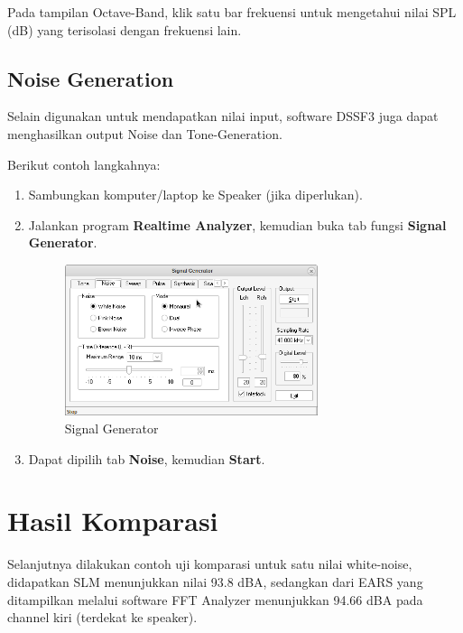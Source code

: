 \documentclass[12pt]{book}
\begin{document}
	Pada tampilan Octave-Band, klik satu bar frekuensi untuk mengetahui nilai SPL (dB)
	yang terisolasi dengan frekuensi lain.

	\subsection{Noise Generation}

	Selain digunakan untuk mendapatkan nilai input, software DSSF3 juga dapat menghasilkan output Noise dan Tone-Generation.

	Berikut contoh langkahnya:

	\begin{enumerate}
		\item Sambungkan komputer/laptop ke Speaker (jika diperlukan).

		\item Jalankan program \textbf{Realtime Analyzer}, kemudian buka tab fungsi \textbf{Signal Generator}.

		\newpage
		\begin{figure}[!ht]
			\centering
			\includegraphics[width=0.7\textwidth]{images/dssf3/signalgen}
			\caption{Signal Generator}
		\end{figure}

		\item Dapat dipilih tab \textbf{Noise}, kemudian \textbf{Start}.
	\end{enumerate}

	\section{Hasil Komparasi}

	Selanjutnya dilakukan contoh uji komparasi untuk satu nilai white-noise,
	didapatkan SLM menunjukkan nilai 93.8 dBA,
	sedangkan dari EARS yang ditampilkan melalui software FFT Analyzer menunjukkan 94.66 dBA pada channel kiri (terdekat ke speaker).
\end{document}
